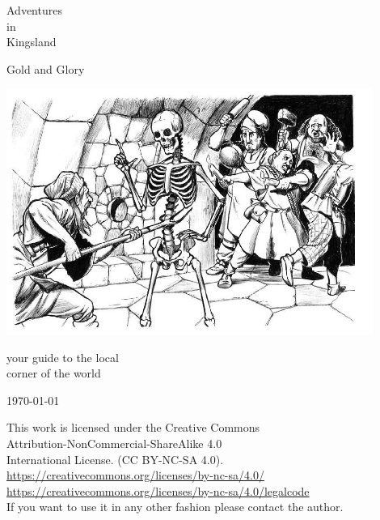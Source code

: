 \begin{center}

\huge         Adventures  \\
                  in      \\
              Kingsland   

\vspace{0.3\baselineskip}

\large      Gold and Glory

\vspace{2cm}

\includegraphics[width=120mm]{./fig/skeleton.jpg}

\vspace{2 cm}


\normalsize
          your guide to the local    \\
            corner of the world

\vfill

\today

\end{center}






\clearpage
\thispagestyle{empty}
\raggedbottom

\noindent \vsmall 
This work is licensed under the Creative Commons\\ Attribution-NonCommercial-ShareAlike 4.0 \\
International License. (CC BY-NC-SA 4.0).\\
\url{https://creativecommons.org/licenses/by-nc-sa/4.0/} \\
\url{https://creativecommons.org/licenses/by-nc-sa/4.0/legalcode} \\
If you want to use it in any other fashion please contact the author.
\normalsize






